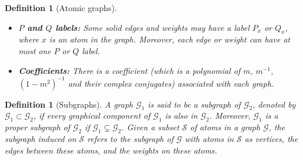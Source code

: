 \documentclass{article}
\newcommand{\1}{\mathds{1}}
\numberwithin{equation}{section}
\renewcommand{\cal}{\mathcal}
\newcommand{\dashed}{\text{diffusive}}
\theoremstyle{plain} %
\newtheorem{definition}[theorem]{Definition}
\theoremstyle{remark}
\newcommand{\cor}{\color{red}}
\newcommand{\nc}{\normalcolor}
\newcommand{\hty}[1]{{\cor (ht: #1) }}
\begin{document}
\begin{definition}[Atomic graphs]
\begin{itemize}
\item{\bf $P$ and $Q$ labels:} Some solid edges and weights may have a label $P_x$ or $Q_x$, where $x$ is an atom in the graph. Moreover, each edge or weight can have at most one $P$ or $Q$ label. 

\item{\bf Coefficients:} There is a coefficient (which is a polynomial of $m$, $m^{-1}$, $(1-m^2)^{-1}$ and their complex conjugates) associated with each graph.  


\end{itemize}

\end{definition}


  
\begin{definition}[Subgraphs]\label{def_sub}
A graph $\cal G_1$ is said to be a subgraph of $\cal G_2$, denoted by $\cal G_1\subset \cal G_2$, if every graphical component of $\cal G_1$ is also in $\cal G_2$. Moreover, $\cal G_1 $ is a proper subgraph of $\cal G_2$ if  $\cal G_1\subsetneq \cal G_2$. 
Given a subset $\cal S$ of atoms in a graph $\cal G$, the subgraph induced on $\cal S$ %
refers to the subgraph of $\cal G$ with atoms in $\cal S$ as vertices, the edges between these atoms, and the weights on these atoms.  
\end{definition}
\end{document}
